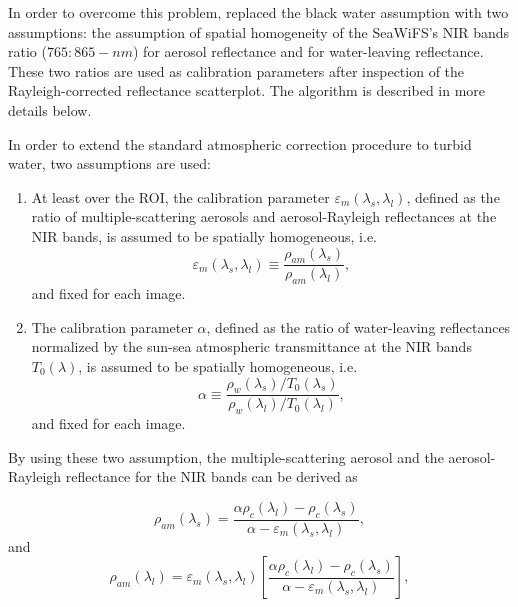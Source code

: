 In order to overcome this problem, \citet{Ruddick:2000bs} replaced the black water assumption with two assumptions: the assumption of spatial homogeneity of the SeaWiFS's NIR bands ratio ($765:865-nm$) for aerosol reflectance and for water-leaving reflectance. These two ratios are used as calibration parameters after inspection of the Rayleigh-corrected reflectance scatterplot. The algorithm is described in more details below.

In order to extend the standard atmospheric correction procedure to turbid water, two assumptions are used:

\begin{enumerate}[itemsep=2pt,parsep=2pt]
  \item At least over the ROI, the calibration parameter $\varepsilon_m(\lambda_s,\lambda_l)$, defined as the ratio of multiple-scattering aerosols and aerosol-Rayleigh reflectances at the NIR bands, is assumed to be spatially homogeneous, i.e.
  \begin{equation}\label{eq:rhohomo}
    \varepsilon_m(\lambda_s,\lambda_l)\equiv \frac{\rho_{am}(\lambda_s)}{\rho_{am}(\lambda_l)},
  \end{equation}
  and fixed for each image.

  \item The calibration parameter $\alpha$, defined as the ratio of water-leaving reflectances normalized by the sun-sea atmospheric transmittance at the NIR bands $T_0(\lambda)$, is assumed to be spatially homogeneous, i.e.
  \begin{equation}\label{eq:alpha}
    \alpha \equiv \frac{\rho_w(\lambda_s)/T_0(\lambda_s)}{\rho_w(\lambda_l)/T_0(\lambda_l)},
  \end{equation}
  and fixed for each image.
\end{enumerate}

By using these two assumption, the multiple-scattering aerosol and the aerosol-Rayleigh reflectance for the NIR bands can be derived as

\begin{equation}\label{eq:rhoams}
  \rho_{am}(\lambda_s) = \frac{\alpha\rho_c(\lambda_l)-\rho_c(\lambda_s)}{\alpha-\varepsilon_m(\lambda_s,\lambda_l)},
\end{equation}
and
\begin{equation}\label{eq:rhoaml}
  \rho_{am}(\lambda_l) = \varepsilon_m(\lambda_s,\lambda_l)\left[\frac{\alpha\rho_c(\lambda_l)-\rho_c(\lambda_s)}{\alpha-\varepsilon_m(\lambda_s,\lambda_l)}\right],
\end{equation}

